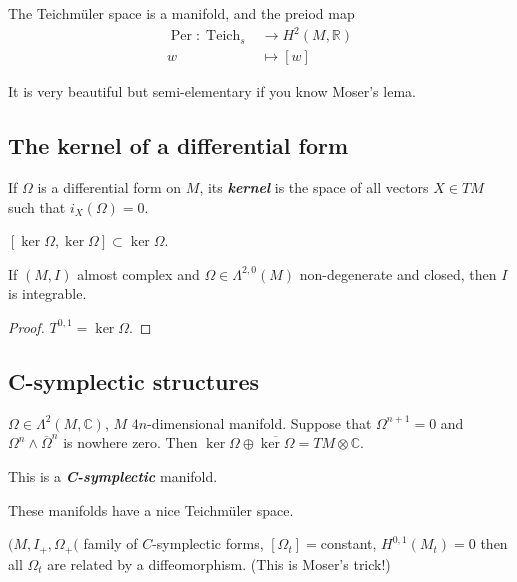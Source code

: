 \begin{thm}[Moser, 1965]\leavevmode
	The Teichm\"uler space is a manifold, and the preiod map
		\begin{align*}
		\operatorname{Per}:\operatorname{Teich}_{s}&\longrightarrow H^{2}(M,\mathbb{R})\\
		w &\longmapsto [w]
		\end{align*}
\end{thm}

It is very beautiful but semi-elementary if you know Moser's lema.

\subsection{The kernel of a differential form}

If $\Omega$ is a differential form on $M$, its \textit{\textbf{kernel}} is the space of all vectors  $X\in TM$ such that $i_X(\Omega)=0$.

 \begin{prop}
	 $[\ker \Omega,\ker \Omega]\subset \ker \Omega$.
\end{prop}

\begin{coro}
	If  $(M,I)$ almost complex and  $\Omega\in\Lambda^{2,0}(M)$ non-degenerate and closed, then $I$ is integrable.
\end{coro}

\begin{proof}
	$T^{0,1}=\ker \Omega$.
\end{proof}

\subsection{C-symplectic structures}

\begin{defn}
	$\Omega\in\Lambda^{2}(M,\mathbb{C})$, $M$ $4n$-dimensional manifold. Suppose that  $\Omega^{n+1}=0$ and $\Omega^n\wedge \overline{\Omega}^n$ is nowhere zero. Then $\ker \Omega\oplus \overline{\ker \Omega}=TM\otimes \mathbb{C}$.

	This is a \textit{\textbf{C-symplectic}} manifold.
\end{defn}

These manifolds have a nice Teichm\"uler space.

\begin{thm}\leavevmode
	$(M,I_+,\Omega_+($ family of  $C$-symplectic forms, $[\Omega_t]=$constant, $H^{0,1}(M_t)=0$ then all $\Omega_t$ are related by a diffeomorphism. (This is Moser's trick!)
\end{thm}

